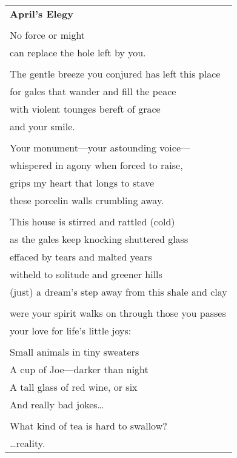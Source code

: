\documentclass{article}
\begin{document}
\begin{center}
\begin{tabular}{l}
\textbf{April's Elegy} \\
\\
No force or might \\
can replace the hole left by you. \\
\\
The gentle breeze you conjured has left this place \\
for gales that wander and fill the peace \\
with violent tounges bereft of grace \\
and your smile. \\
\\
Your monument---your astounding voice--- \\
whispered in agony when forced to raise, \\
grips my heart that longs to stave \\
these porcelin walls crumbling away. \\
\\
This house is stirred and rattled (cold) \\
as the gales keep knocking shuttered glass \\
effaced by tears and malted years \\
witheld to solitude and greener hills \\
(just) a dream's step away from this shale and clay \\
\\
were your spirit walks on through those you passes \\
your love for life's little joys: \\
\\
\hspace*{4ex}Small animals in tiny sweaters \\
\hspace*{4ex}A cup of Joe---darker than night \\
\hspace*{4ex}A tall glass of red wine, or six \\
\hspace*{4ex}And really bad jokes\ldots \\
\\
What kind of tea is hard to swallow? \\
\hspace*{16ex}\ldots{}reality. \\
\end{tabular}
\end{center}
\end{document}
